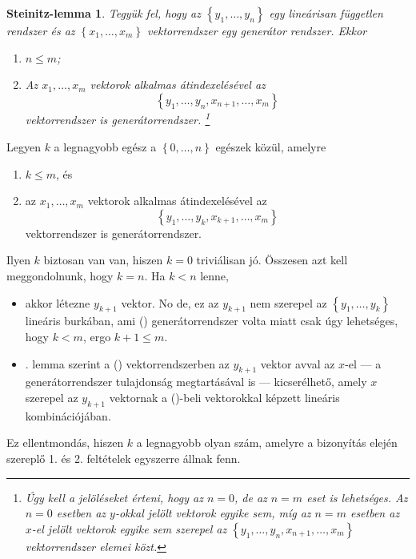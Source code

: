 \documentclass[9pt, showtrims]{memoir}
\makeatletter
\let\Aref\relax
\renewenvironment{proof}[1][\proofname]
    {\par\pushQED{\qed}%
    \normalfont \topsep6\p@\@plus6\p@\relax
    \trivlist
    \item[\hskip\labelsep
        \itshape
    #1\@addpunct{:}]\ignorespaces}
    {\popQED\endtrivlist\@endpefalse}
\theoremstyle{plain}
\newtheorem*{SL}{Steinitz-lemma}
\theoremstyle{remark}
\theoremstyle{definition}
\makeatother
\begin{document}
\begin{SL}
    Tegyük fel, hogy az $\left\{ y_1,\dots,y_n \right\}$ egy lineárisan független rendszer és az
    $\left\{ x_1,\dots,x_m \right\}$ vektorrendszer egy generátor rendszer.
    Ekkor
    \begin{enumerate}
        \item $n\leq m$;
        \item Az $x_1,\dots,x_m$ vektorok alkalmas átindexelésével az
            \[
                \left\{ y_1,\dots,y_n,x_{n+1},\dots,x_m \right\}
            \]
            vektorrendszer is generátorrendszer.%
            \footnote{Úgy kell a jelöléseket érteni, hogy az $n=0$, de az $n=m$ eset is lehetséges. 
                Az $n=0$ esetben az $y$-okkal jelölt vektorok egyike sem,
                míg az $n=m$ esetben az $x$-el jelölt vektorok egyike sem szerepel az 
                \(
                \left\{ y_1,\dots,y_n,x_{n+1},\dots,x_m \right\}
                \)
            vektorrendszer elemei közt.}%
            \qedhere
    \end{enumerate}
    \label{le:Stienitz}
\end{SL}
\begin{proof}
    Legyen $k$ a legnagyobb egész a $\left\{ 0,\dots,n \right\}$ egészek közül, amelyre
    \begin{enumerate}
        \item $k\leq m$, és
        \item az $x_1,\dots,x_m$ vektorok alkalmas átindexelésével az
            \[
                \left\{ y_1,\dots,y_k,x_{k+1},\dots,x_m \right\}\tag{\dag}
            \]
            vektorrendszer is generátorrendszer.
    \end{enumerate}
    Ilyen $k$ biztosan van van, hiszen $k=0$ triviálisan jó.
    Összesen azt kell meggondolnunk, hogy $k=n$.
    Ha $k<n$ lenne, 
    \begin{itemize}
        \item 
            akkor létezne $y_{k+1}$ vektor.
            No de, ez az $y_{k+1}$ nem szerepel az $\left\{ y_1,\dots,y_k \right\}$ lineáris burkában,
            ami (\dag) generátorrendszer volta miatt csak úgy lehetséges, hogy $k<m$, 
            ergo $k+1\leq m$.
        \item
            \Aref{le:gencsere}. lemma szerint a (\dag) vektorrendszerben az $y_{k+1}$ vektor 
            avval az $x$-el
            --- a generátorrendszer tulajdonság megtartásával is --- 
            kicserélhető, 
            amely $x$ szerepel az $y_{k+1}$ vektornak a (\dag)-beli
            vektorokkal képzett lineáris kombinációjában. 
    \end{itemize}
    Ez ellentmondás, hiszen $k$ a legnagyobb olyan szám, 
    amelyre a bizonyítás elején szereplő 1. és 2. feltételek egyszerre állnak fenn.
\end{proof}
\end{document}
